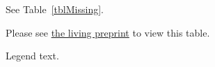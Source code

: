 See Table~\ref{tblMissing}.

\begin{tcolorbox}[colback=red!5!white,colframe=red!75!black,title={\refstepcounter{table}Table~\thetable: Results \label{tblMissing}}]

Please see \href{https://preprint.neurolibre.org/}{the living preprint} to view this table.

\vspace{1em}

Legend text.

\end{tcolorbox}
